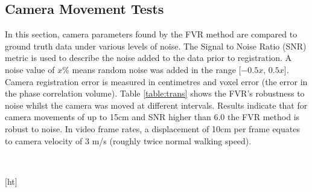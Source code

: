 

\subsection{Camera Movement Tests}

In this section, camera parameters found by the FVR method are compared to ground truth data under various levels of noise. The Signal to Noise Ratio (SNR) metric is used to describe the noise added to the data prior to registration. A noise value of $x$\% means random noise was added in the range [$-0.5x$, $0.5x$]. Camera registration error is measured in centimetres and voxel error (the error in the phase correlation volume). Table \ref{table:trans} shows the FVR's robustness to noise whilst the camera was moved at different intervals. Results indicate that for camera movements of up to 15cm and SNR higher than 6.0 the FVR method is robust to noise. In video frame rates, a displacement of 10cm per frame equates to camera velocity of 3 m/s (roughly twice normal walking speed).  \\


\begin{table}[ht]
\centering
{}
\\
\caption{Translation Tracking}
\label{table:trans}
\end{table}[ht]


